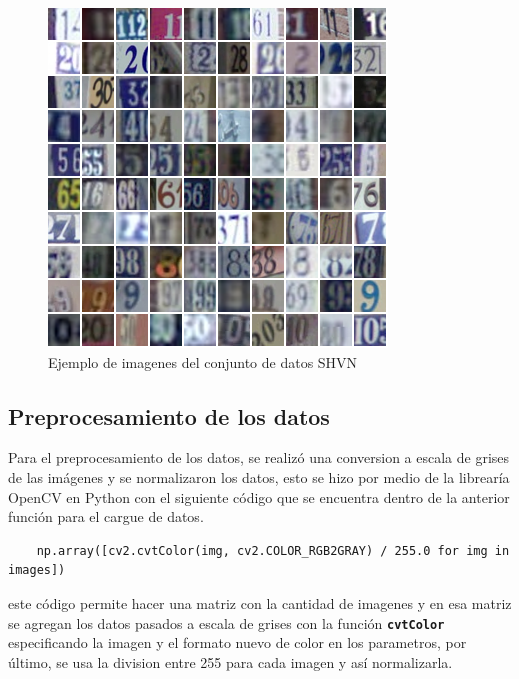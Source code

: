 \begin{figure}[htbp]
    \centering
    \includegraphics[width=\linewidth]{src/figures/shvn_color.png}
    \caption{Ejemplo de imagenes del conjunto de datos SHVN \cite{shvn_color}}
    \label{fig:shvn_color}
\end{figure}

\subsection{Preprocesamiento de los datos}
Para el preprocesamiento de los datos, se realizó una conversion a escala de grises de las imágenes y se normalizaron los datos,
esto se hizo por medio de la librearía OpenCV en Python con el siguiente código que se encuentra dentro de la anterior función
para el cargue de datos. 

\begin{lstlisting}
    np.array([cv2.cvtColor(img, cv2.COLOR_RGB2GRAY) / 255.0 for img in images])
\end{lstlisting}

este código permite hacer una matriz con la cantidad de imagenes y en esa matriz se agregan los datos pasados a escala de grises con
la función \textbf{\texttt{cvtColor}} especificando la imagen y el formato nuevo de color en los parametros, por último, se usa 
la division entre 255 para cada imagen y así normalizarla.

